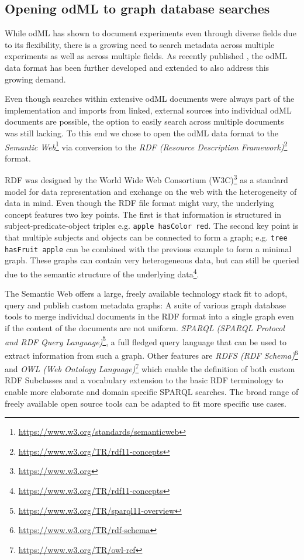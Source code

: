 \documentclass{article}
\begin{document}
\subsection{Opening odML to graph database searches} \label{sec:why_rdf}

While odML has shown to document experiments even through diverse fields due to its flexibility, there is a growing need to search metadata across multiple experiments as well as across multiple fields. As recently published \cite{Sprenger_2019}, the odML data format has been further developed and extended to also address this growing demand.

Even though searches within extensive odML documents were always part of the implementation and imports from linked, external sources into individual odML documents are possible, the option to easily search across multiple documents was still lacking. To this end we chose to open the odML data format to the \textit{Semantic Web}\footnote{\url{https://www.w3.org/standards/semanticweb}} via conversion to the \textit{RDF (Resource Description Framework)}\footnote{\url{https://www.w3.org/TR/rdf11-concepts}} format.

RDF was designed by the World Wide Web Consortium (W3C)\footnote{\url{https://www.w3.org}} as a standard model for data representation and exchange on the web with the heterogeneity of data in mind. Even though the RDF file format might vary, the underlying concept features two key points. The first is that information is structured in subject-predicate-object triples e.g. \texttt{apple hasColor red}. The second key point is that multiple subjects and objects can be connected to form a graph; e.g. \texttt{tree hasFruit apple} can be combined with the previous example to form a minimal graph. These graphs can contain very heterogeneous data, but can still be queried due to the semantic structure of the underlying data\footnote{\url{https://www.w3.org/TR/rdf11-concepts}}.

The Semantic Web offers a large, freely available technology stack fit to adopt, query and publish custom metadata graphs: A suite of various graph database tools to merge individual documents in the RDF format into a single graph even if the content of the documents are not uniform. \textit{SPARQL (SPARQL Protocol and RDF Query Language)}\footnote{\url{https://www.w3.org/TR/sparql11-overview}}, a full fledged query language that can be used to extract information from such a graph. Other features are \textit{RDFS (RDF Schema)}\footnote{\url{https://www.w3.org/TR/rdf-schema}} and \textit{OWL (Web Ontology Language)}\footnote{\url{https://www.w3.org/TR/owl-ref}} which enable the definition of both custom RDF Subclasses and a vocabulary extension to the basic RDF terminology to enable more elaborate and domain specific SPARQL searches. The broad range of freely available open source tools can be adapted to fit more specific use cases.
\end{document}
